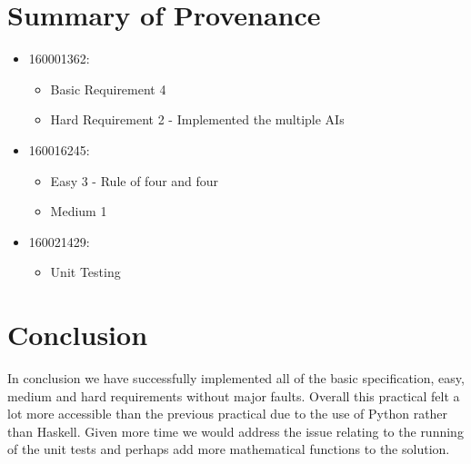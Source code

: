 \documentclass[11]{article}
\begin{document}
	\section{Summary of Provenance}
			\begin{itemize}
				\item 160001362:
					\begin{itemize}
						\item Basic Requirement 4
						\item Hard Requirement 2 - Implemented the multiple AIs
					\end{itemize}
					
				\item 160016245:
					\begin{itemize}
						\item Easy 3 - Rule of four and four
						\item Medium 1
					\end{itemize}
					
				\item 160021429:
					\begin{itemize}
						\item Unit Testing 
					\end{itemize}
			\end{itemize}
				
	
\section{Conclusion}
In conclusion we have successfully implemented all of the basic specification, easy, medium and hard requirements without major faults. Overall this practical felt a lot more accessible than the previous practical due to the use of Python rather than Haskell. Given more time we would address the issue relating to the running of the unit tests and perhaps add more mathematical functions to the solution.
\end{document}
